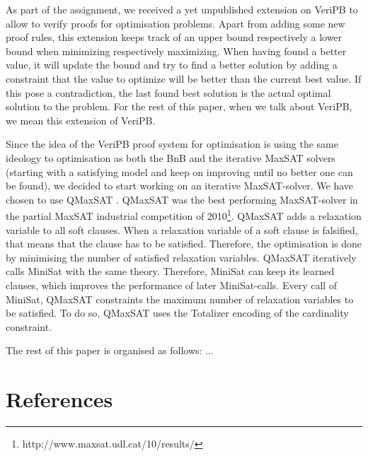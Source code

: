 \documentclass{article}
\theoremstyle{mytheoremstyle}
\theoremstyle{mytheoremstyle}
\theoremstyle{myproblemstyle}
\begin{document}
 


As part of the assignment, we received a yet unpublished extension on VeriPB to allow to verify proofs for optimisation problems. Apart from adding some new proof rules, this extension keeps track of an upper bound respectively a lower bound when minimizing respectively maximizing. When having found a better value, it will update the bound and try to find a better solution by adding a constraint that the value to optimize will be better than the current best value. If this pose a contradiction, the last found best solution is the actual optimal solution to the problem. For the rest of this paper, when we talk about VeriPB, we mean this extension of VeriPB.\newline \par

Since the idea of the VeriPB proof system for optimisation is using the same ideology to optimisation as both the BnB and the iterative MaxSAT solvers (starting with a satisfying model and keep on improving until no better one can be found), we decided to start working on an iterative MaxSAT-solver. We have chosen to use QMaxSAT \autocite{qmaxsat}. QMaxSAT was the best performing MaxSAT-solver in the partial MaxSAT industrial competition of 2010\footnote{http://www.maxsat.udl.cat/10/results/}. QMaxSAT adds a relaxation variable to all soft clauses. When a relaxation variable of a soft clause is falsified, that means that the clause has to be satisfied. Therefore, the optimisation is done by minimising the number of satisfied relaxation variables. QMaxSAT iteratively calls MiniSat \autocite{minisat} with the same theory. Therefore, MiniSat can keep its learned clauses, which improves the performance of later MiniSat-calls. Every call of MiniSat, QMaxSAT constraints the maximum number of relaxation variables to be satisfied. To do so, QMaxSAT uses the Totalizer encoding \autocite{encoding} of the cardinality constraint. \newline \par

The rest of this paper is organised as follows: ...


\section{References}
\printbibliography[heading=none]
\end{document}

